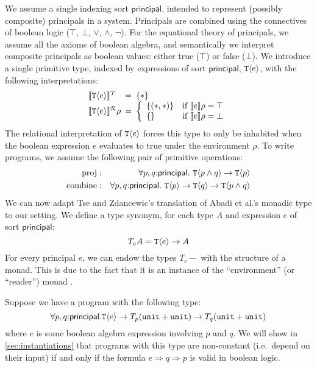 We assume a single indexing sort $\mathsf{principal}$, intended to
represent (possibly composite) principals in a system. Principals are
combined using the connectives of boolean logic ($\top$, $\bot$,
$\lor$, $\land$, $\lnot$). For the equational theory of principals, we
assume all the axioms of boolean algebra, and semantically we
interpret composite principals as boolean values: either true ($\top$)
or false ($\bot$). We introduce a single primitive type, indexed by
expressions of sort $\mathsf{principal}$, $\textup{\texttt{T}}\langle e \rangle$, with the
following interpretations:
\begin{displaymath}
  \begin{array}{l@{\hspace{0.5em}=\hspace{0.5em}}l}
    \tySem{\tyPrim{T}{e}} & \{*\} \\
    \rsem{\tyPrim{T}{e}}{}\rho & \left\{
      \begin{array}{ll}
        \{(*,*)\} & \textrm{if }\sem{e}\rho = \top \\
        \{\}      & \textrm{if }\sem{e}\rho = \bot
      \end{array}
      \right.
  \end{array}
\end{displaymath}
The relational interpretation of $\textup{\texttt{T}}\langle e \rangle$ forces this type to
only be inhabited when the boolean expression $e$ evaluates to true
under the environment $\rho$. To write programs, we assume the
following pair of primitive operations:
\begin{eqnarray*}
  \mathrm{proj} & : & \forall p, q\mathord:\mathsf{principal}.\ \tyPrim{T}{p \land q} \to \tyPrim{T}{p} \\
  \mathrm{combine} & : & \forall p, q\mathord:\mathsf{principal}.\ \tyPrim{T}{p} \to \tyPrim{T}{q} \to \tyPrim{T}{p \land q}
\end{eqnarray*}
We can now adapt Tse and Zdancewic's translation of Abadi et al.'s
monadic type to our setting. We define a type synonym, for each type
$A$ and expression $e$ of sort $\mathsf{principal}$:
\begin{displaymath}
  T_eA = \textup{\texttt{T}}\langle e \rangle \to A
\end{displaymath}
For every principal $e$, we can endow the types $T_e-$ with the
structure of a monad. This is due to the fact that it is an instance
of the ``environment'' (or ``reader'') monad \cite{jones95functional}.

\begin{example}
  Suppose we have a program with the following type:
  \begin{displaymath}
    \forall p,q\mathord:\mathsf{principal}. \textup{\texttt{T}}\langle e \rangle \to T_p(\texttt{unit} + \texttt{unit}) \to T_q(\texttt{unit} + \texttt{unit})
  \end{displaymath}
  where $e$ is some boolean algebra expression involving $p$ and
  $q$. We will show in \autoref{sec:instantiations} that programs with
  this type are non-constant (i.e.~depend on their input) if and only
  if the formula $e \Rightarrow q \Rightarrow p$ is valid in boolean
  logic.
\end{example}


